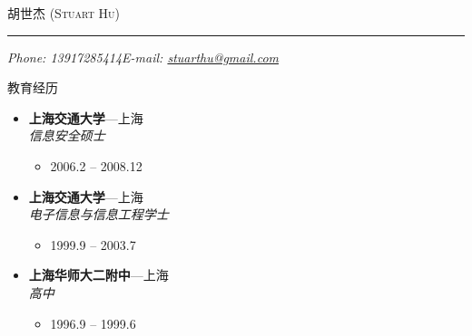 \documentclass[11pt,oneside]{article}
\makeatletter
\newcommand{\name}{胡世杰 (Stuart Hu)}
\newcommand{\phone}{Phone: 13917285414}
\newcommand{\email}{E-mail: \href{mailto:stuarthu@gmail.com}{stuarthu@gmail.com}}
\newcommand{\bigname}[1]{
	\begin{center}\selectfont\Huge\scshape#1\end{center}
}
\newenvironment{ressection}[1]{
	\vspace{4pt}
	{\selectfont\Large#1}
	\begin{itemize}
	\vspace{3pt}
}{
	\end{itemize}
}
\newcommand{\ressubitem}[1]{
	\vspace{-1pt}
	\item \begin{flushleft} #1 \end{flushleft}
}
\newcommand{\resbigitem}[3]{
	\vspace{-5pt}
	\item
	\textbf{#1}---#2 \\
	\textit{#3}
}
\newenvironment{ressubsec}[3]{
	\resbigitem{#1}{#2}{#3}
	\vspace{-2pt}
	\begin{itemize}
}{
    \end{itemize}
}
\makeatother
\begin{document}
\bigname{\name}

\vspace{-8pt} \rule{\textwidth}{1pt}

\vspace{-1pt} {\small\itshape \phone \hfill \email}

\vspace{8 pt}


\begin{ressection}{教育经历}

	\begin{ressubsec}{上海交通大学}{上海}{信息安全硕士}
		\ressubitem{2006.2 -- 2008.12}
	\end{ressubsec}

	\begin{ressubsec}{上海交通大学}{上海}{电子信息与信息工程学士}
		\ressubitem{1999.9 -- 2003.7}
	\end{ressubsec}

	\begin{ressubsec}{上海华师大二附中}{上海}{高中}
		\ressubitem{1996.9 -- 1999.6}
	\end{ressubsec}

\end{ressection}
\end{document}
